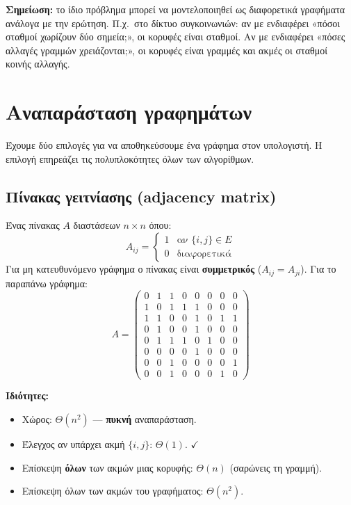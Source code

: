 \documentclass[11pt,a4paper]{article}
\begin{document}
\begin{intuition}
\textbf{Σημείωση:} το ίδιο πρόβλημα μπορεί να μοντελοποιηθεί ως διαφορετικά
γραφήματα ανάλογα με την ερώτηση. Π.χ.\ στο δίκτυο συγκοινωνιών: αν με ενδιαφέρει
«πόσοι σταθμοί χωρίζουν δύο σημεία;», οι κορυφές είναι σταθμοί. Αν με ενδιαφέρει
«πόσες αλλαγές γραμμών χρειάζονται;», οι κορυφές είναι γραμμές και ακμές οι
σταθμοί κοινής αλλαγής.
\end{intuition}

\section{Αναπαράσταση γραφημάτων}

Έχουμε δύο επιλογές για να αποθηκεύσουμε ένα γράφημα στον υπολογιστή. Η επιλογή
επηρεάζει τις πολυπλοκότητες όλων των αλγορίθμων.

\subsection{Πίνακας γειτνίασης (adjacency matrix)}

Ένας πίνακας $A$ διαστάσεων $n \times n$ όπου:
\[
A_{ij} = \begin{cases} 1 & \text{αν } \{i, j\} \in E \\ 0 & \text{διαφορετικά}
\end{cases}
\]
Για μη κατευθυνόμενο γράφημα ο πίνακας είναι \textbf{συμμετρικός}
($A_{ij} = A_{ji}$). Για το παραπάνω γράφημα:
\[
A =
\begin{pmatrix}
0 & 1 & 1 & 0 & 0 & 0 & 0 & 0 \\
1 & 0 & 1 & 1 & 1 & 0 & 0 & 0 \\
1 & 1 & 0 & 0 & 1 & 0 & 1 & 1 \\
0 & 1 & 0 & 0 & 1 & 0 & 0 & 0 \\
0 & 1 & 1 & 1 & 0 & 1 & 0 & 0 \\
0 & 0 & 0 & 0 & 1 & 0 & 0 & 0 \\
0 & 0 & 1 & 0 & 0 & 0 & 0 & 1 \\
0 & 0 & 1 & 0 & 0 & 0 & 1 & 0
\end{pmatrix}
\]

\textbf{Ιδιότητες:}
\begin{itemize}
  \item Χώρος: $\Theta(n^2)$ --- \textbf{πυκνή} αναπαράσταση.
  \item Έλεγχος αν υπάρχει ακμή $\{i, j\}$: $\Theta(1)$. $\checkmark$
  \item Επίσκεψη \textbf{όλων} των ακμών μιας κορυφής: $\Theta(n)$ (σαρώνεις τη
  γραμμή).
  \item Επίσκεψη όλων των ακμών του γραφήματος: $\Theta(n^2)$.
\end{itemize}
\end{document}
